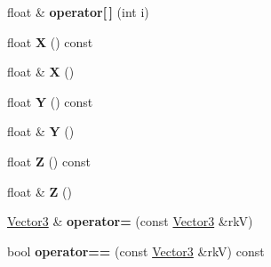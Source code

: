 \begin{DoxyCompactItemize}
\item 
float \& {\bfseries operator\mbox{[}$\,$\mbox{]}} (int i)\hypertarget{class_i_dream_sky_1_1_vector3_a2c0b1d67d00bce2cb51d5c67f8dac0f7}{}\label{class_i_dream_sky_1_1_vector3_a2c0b1d67d00bce2cb51d5c67f8dac0f7}

\item 
float {\bfseries X} () const \hypertarget{class_i_dream_sky_1_1_vector3_a1c745d1161541474f72916ec8a512adc}{}\label{class_i_dream_sky_1_1_vector3_a1c745d1161541474f72916ec8a512adc}

\item 
float \& {\bfseries X} ()\hypertarget{class_i_dream_sky_1_1_vector3_ac171dd689f36a5cb4978b0b365383cfb}{}\label{class_i_dream_sky_1_1_vector3_ac171dd689f36a5cb4978b0b365383cfb}

\item 
float {\bfseries Y} () const \hypertarget{class_i_dream_sky_1_1_vector3_a56824cc0b4884589e3d94dc8c033d457}{}\label{class_i_dream_sky_1_1_vector3_a56824cc0b4884589e3d94dc8c033d457}

\item 
float \& {\bfseries Y} ()\hypertarget{class_i_dream_sky_1_1_vector3_a69ea172e2f4ad73461a7fd976b77217b}{}\label{class_i_dream_sky_1_1_vector3_a69ea172e2f4ad73461a7fd976b77217b}

\item 
float {\bfseries Z} () const \hypertarget{class_i_dream_sky_1_1_vector3_ab0f82da2cdf3e8c3d171556f64b77098}{}\label{class_i_dream_sky_1_1_vector3_ab0f82da2cdf3e8c3d171556f64b77098}

\item 
float \& {\bfseries Z} ()\hypertarget{class_i_dream_sky_1_1_vector3_a5be54d6f4ca2a0db1c66abe587bbe1fb}{}\label{class_i_dream_sky_1_1_vector3_a5be54d6f4ca2a0db1c66abe587bbe1fb}

\item 
\hyperlink{class_i_dream_sky_1_1_vector3}{Vector3} \& {\bfseries operator=} (const \hyperlink{class_i_dream_sky_1_1_vector3}{Vector3} \&rkV)\hypertarget{class_i_dream_sky_1_1_vector3_a1d9f0c8c9b2e7ed1f5fb6554cb2b7f72}{}\label{class_i_dream_sky_1_1_vector3_a1d9f0c8c9b2e7ed1f5fb6554cb2b7f72}

\item 
bool {\bfseries operator==} (const \hyperlink{class_i_dream_sky_1_1_vector3}{Vector3} \&rkV) const \hypertarget{class_i_dream_sky_1_1_vector3_aafc40d03d6eca6758a9fc83a716889a5}{}\label{class_i_dream_sky_1_1_vector3_aafc40d03d6eca6758a9fc83a716889a5}


\end{DoxyCompactItemize}
